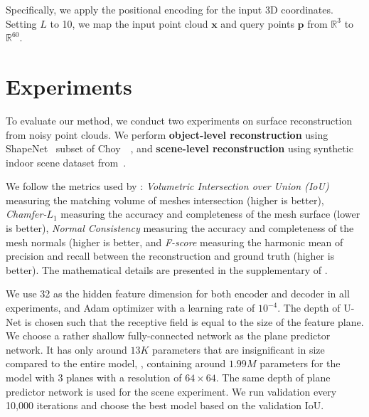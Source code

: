 \documentclass[10pt,twocolumn,letterpaper]{article}
\newcommand{\boldparagraph}[1]{\vspace{0.2cm}\noindent{\bf #1:} }
\begin{document}
Specifically, we apply the positional encoding for the input 3D coordinates. Setting $L$ to 10, we map the input point cloud $\mathbf{x}$ and query points $\mathbf{p}$ from $\mathbb{R}^3$ to $\mathbb{R}^{60}$.

\section{Experiments}

To evaluate our method, we conduct two experiments on surface reconstruction from noisy point clouds. We perform \textbf{object-level reconstruction} using ShapeNet~\cite{chang2015shapenet} subset of Choy~\etal~\cite{choy20163d}, and \textbf{scene-level reconstruction} using synthetic indoor scene dataset from~\cite{peng2020convolutional}. 

\boldparagraph{Metrics} We follow the metrics used by \cite{peng2020convolutional}: \emph{Volumetric Intersection over Union (IoU)} measuring the matching volume of meshes intersection (higher is better), \emph{Chamfer-$L_1$} measuring the accuracy and completeness of the mesh surface (lower is better), \emph{Normal Consistency} measuring the accuracy and completeness of the mesh normals (higher is better, and \emph{F-score} measuring the harmonic mean of precision and recall between the reconstruction and ground truth (higher is better). The mathematical details are presented in the supplementary of \cite{peng2020convolutional}.

\boldparagraph{Implementation details} We use 32 as the hidden feature dimension for both encoder and decoder in all experiments, and Adam optimizer with a learning rate of $10^{-4}$. The depth of U-Net is chosen such that the receptive field
is equal to the size of the feature plane.
We choose a rather shallow fully-connected network as the plane predictor network. It has only around $13K$ parameters that are insignificant in size compared to the entire model, \eg, containing around $1.99M$ parameters for the model with 3 planes with a resolution of $64\times64$. The same depth of plane predictor network is used for the scene experiment. We run validation every 10,000 iterations and choose the best model based on the validation IoU.
\end{document}
